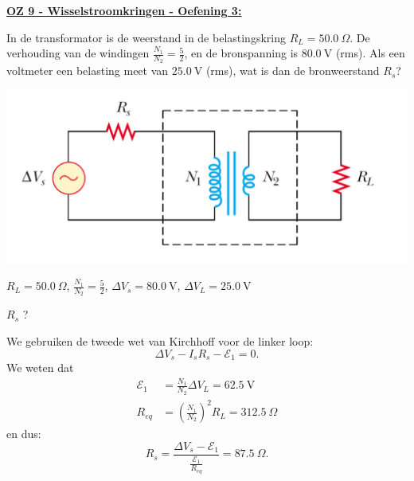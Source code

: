 \textbf{\underline{OZ 9 - Wisselstroomkringen - Oefening 3:}}
\vspace{0.5cm}

In de transformator is de weerstand in de belastingskring $R_L = 50.0 \ \Omega$. De verhouding van de windingen $\tfrac{N_1}{N_2} = \tfrac{5}{2}$, en de bronspanning is $80.0 \ \text{V}$ (rms). Als een voltmeter een belasting meet van $25.0 \ \text{V}$ (rms), wat is dan de bronweerstand $R_s$?


\begin{center}
    \includegraphics[scale = 0.4]{oz09/resources/Oz9Oef3.png}
\end{center}

\begin{description}[labelwidth=1.5cm, leftmargin=!]
    \item[Geg. :] $R_L = 50.0 \ \Omega$, $\tfrac{N_1}{N_2} = \tfrac{5}{2}$, $\Delta V_s = 80.0 \ \text{V}$, $\Delta V_L = 25.0 \ \text{V}$
    \item[Gevr. :]  $R_s$ ?
    \item[Opl. :]   
        We gebruiken de tweede wet van Kirchhoff voor de linker loop:
        \begin{equation*}
                \Delta V_s - I_sR_s - \mathcal{E}_1 = 0.
        \end{equation*}
        We weten dat
        \begin{align*}
            \mathcal{E}_1 &= \frac{N_1}{N_2}\Delta V_L = 62.5 \ \text{V} \\
            R_{eq} &= (\frac{N_1}{N_2})^2 R_L = 312.5 \ \Omega 
        \end{align*}
        en dus:
        \begin{equation*}
            R_s = \frac{\Delta V_s - \mathcal{E}_1}{\frac{\mathcal{E}_1}{R_{eq}}} = 87.5 \ \Omega.
        \end{equation*}
\end{description}

\vspace{1cm}